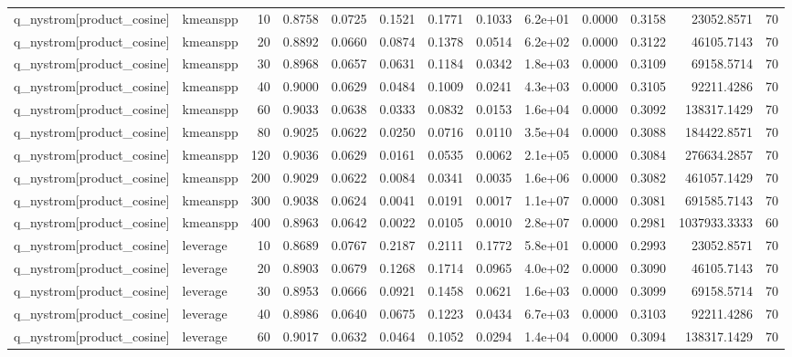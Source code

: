 \begin{table}
\begin{tabular}{llrrrrrrlrrrr}
q\_nystrom[product\_cosine] & kmeanspp & 10 & 0.8758 & 0.0725 & 0.1521 & 0.1771 & 0.1033 & 6.2e+01 & 0.0000 & 0.3158 & 23052.8571 & 70 \\
q\_nystrom[product\_cosine] & kmeanspp & 20 & 0.8892 & 0.0660 & 0.0874 & 0.1378 & 0.0514 & 6.2e+02 & 0.0000 & 0.3122 & 46105.7143 & 70 \\
q\_nystrom[product\_cosine] & kmeanspp & 30 & 0.8968 & 0.0657 & 0.0631 & 0.1184 & 0.0342 & 1.8e+03 & 0.0000 & 0.3109 & 69158.5714 & 70 \\
q\_nystrom[product\_cosine] & kmeanspp & 40 & 0.9000 & 0.0629 & 0.0484 & 0.1009 & 0.0241 & 4.3e+03 & 0.0000 & 0.3105 & 92211.4286 & 70 \\
q\_nystrom[product\_cosine] & kmeanspp & 60 & 0.9033 & 0.0638 & 0.0333 & 0.0832 & 0.0153 & 1.6e+04 & 0.0000 & 0.3092 & 138317.1429 & 70 \\
q\_nystrom[product\_cosine] & kmeanspp & 80 & 0.9025 & 0.0622 & 0.0250 & 0.0716 & 0.0110 & 3.5e+04 & 0.0000 & 0.3088 & 184422.8571 & 70 \\
q\_nystrom[product\_cosine] & kmeanspp & 120 & 0.9036 & 0.0629 & 0.0161 & 0.0535 & 0.0062 & 2.1e+05 & 0.0000 & 0.3084 & 276634.2857 & 70 \\
q\_nystrom[product\_cosine] & kmeanspp & 200 & 0.9029 & 0.0622 & 0.0084 & 0.0341 & 0.0035 & 1.6e+06 & 0.0000 & 0.3082 & 461057.1429 & 70 \\
q\_nystrom[product\_cosine] & kmeanspp & 300 & 0.9038 & 0.0624 & 0.0041 & 0.0191 & 0.0017 & 1.1e+07 & 0.0000 & 0.3081 & 691585.7143 & 70 \\
q\_nystrom[product\_cosine] & kmeanspp & 400 & 0.8963 & 0.0642 & 0.0022 & 0.0105 & 0.0010 & 2.8e+07 & 0.0000 & 0.2981 & 1037933.3333 & 60 \\
q\_nystrom[product\_cosine] & leverage & 10 & 0.8689 & 0.0767 & 0.2187 & 0.2111 & 0.1772 & 5.8e+01 & 0.0000 & 0.2993 & 23052.8571 & 70 \\
q\_nystrom[product\_cosine] & leverage & 20 & 0.8903 & 0.0679 & 0.1268 & 0.1714 & 0.0965 & 4.0e+02 & 0.0000 & 0.3090 & 46105.7143 & 70 \\
q\_nystrom[product\_cosine] & leverage & 30 & 0.8953 & 0.0666 & 0.0921 & 0.1458 & 0.0621 & 1.6e+03 & 0.0000 & 0.3099 & 69158.5714 & 70 \\
q\_nystrom[product\_cosine] & leverage & 40 & 0.8986 & 0.0640 & 0.0675 & 0.1223 & 0.0434 & 6.7e+03 & 0.0000 & 0.3103 & 92211.4286 & 70 \\
q\_nystrom[product\_cosine] & leverage & 60 & 0.9017 & 0.0632 & 0.0464 & 0.1052 & 0.0294 & 1.4e+04 & 0.0000 & 0.3094 & 138317.1429 & 70 \\

\end{tabular}
\end{table}
